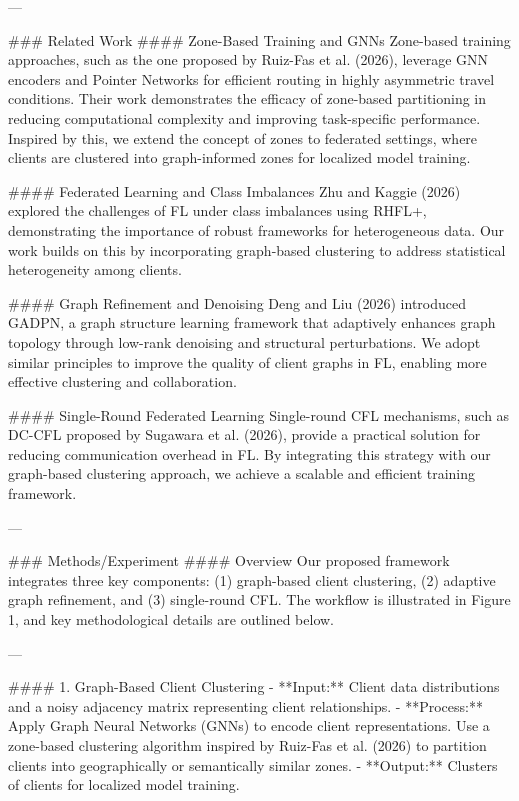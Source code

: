 ---

### Related Work
#### Zone-Based Training and GNNs
Zone-based training approaches, such as the one proposed by Ruiz-Fas et al. (2026), leverage GNN encoders and Pointer Networks for efficient routing in highly asymmetric travel conditions. Their work demonstrates the efficacy of zone-based partitioning in reducing computational complexity and improving task-specific performance. Inspired by this, we extend the concept of zones to federated settings, where clients are clustered into graph-informed zones for localized model training.

#### Federated Learning and Class Imbalances
Zhu and Kaggie (2026) explored the challenges of FL under class imbalances using RHFL+, demonstrating the importance of robust frameworks for heterogeneous data. Our work builds on this by incorporating graph-based clustering to address statistical heterogeneity among clients.

#### Graph Refinement and Denoising
Deng and Liu (2026) introduced GADPN, a graph structure learning framework that adaptively enhances graph topology through low-rank denoising and structural perturbations. We adopt similar principles to improve the quality of client graphs in FL, enabling more effective clustering and collaboration.

#### Single-Round Federated Learning
Single-round CFL mechanisms, such as DC-CFL proposed by Sugawara et al. (2026), provide a practical solution for reducing communication overhead in FL. By integrating this strategy with our graph-based clustering approach, we achieve a scalable and efficient training framework.

---

### Methods/Experiment
#### Overview
Our proposed framework integrates three key components: (1) graph-based client clustering, (2) adaptive graph refinement, and (3) single-round CFL. The workflow is illustrated in Figure 1, and key methodological details are outlined below.

---

#### 1. Graph-Based Client Clustering
- **Input:** Client data distributions and a noisy adjacency matrix representing client relationships.
- **Process:** Apply Graph Neural Networks (GNNs) to encode client representations. Use a zone-based clustering algorithm inspired by Ruiz-Fas et al. (2026) to partition clients into geographically or semantically similar zones.
- **Output:** Clusters of clients for localized model training.

